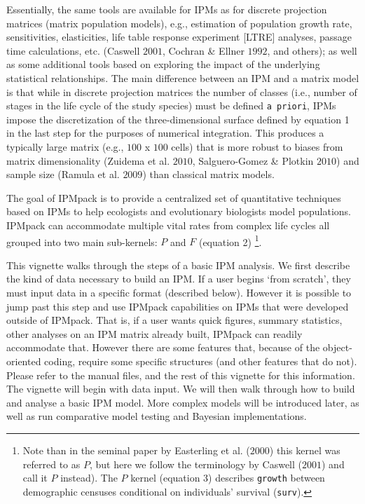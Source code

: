 \documentclass{article}
\begin{document}
Essentially, the same tools are available for IPMs as for discrete projection
matrices (matrix population models), e.g., estimation of population
growth rate, sensitivities, elasticities, life table response
experiment [LTRE] analyses, passage time calculations, etc. (Caswell
$2001$, Cochran \& Ellner $1992$, and others); as well as some
additional tools based on exploring the impact of the underlying
statistical relationships. The main difference
between an IPM and a matrix model is that while in discrete projection
matrices the number of classes (i.e., number of stages in the life
cycle of the study species) must be defined {\tt a priori}, IPMs
impose the discretization of the three-dimensional surface defined by
equation 1 in the last step for the purposes of numerical integration. This produces a typically large matrix (e.g., $100$ x $100$ cells) that is more robust to biases from matrix dimensionality (Zuidema et al. $2010$, Salguero-Gomez \& Plotkin $2010$) and sample size (Ramula et al. $2009$) than classical matrix models.

The goal of IPMpack is to provide a centralized set of quantitative techniques based on IPMs to help ecologists and evolutionary biologists model populations. IPMpack can accommodate multiple vital rates from complex life cycles all grouped into two main sub-kernels: $P$ and $F$ (equation 2) \footnote{Note than in the seminal paper by Easterling et al. ($2000$) this kernel was referred to as $P$, but here we follow the terminology by Caswell ($2001$) and call it $P$ instead). The $P$ kernel (equation 3) describes {\tt growth} between demographic censuses conditional on individuals' survival ({\tt surv}).
}.

This vignette walks through the steps of a basic IPM analysis.  We first
describe the kind of data necessary to build an IPM.  If a user begins `from
scratch', they must input data in a specific format (described below).  However
it is possible to jump past this step and use IPMpack capabilities on IPMs that
were developed outside of IPMpack. That is, if a user wants quick figures, summary statistics, other analyses on an IPM matrix already built, IPMpack can readily accommodate that.   However there are some features that, because of the object-oriented coding, require some specific structures (and other features that do not).  Please refer to the manual files, and the rest of this vignette for this information. The vignette will begin with data input.  We will then walk through how to build and analyse a basic IPM model.  More complex models will be introduced later, as well as run comparative model testing and Bayesian implementations.
\end{document}
